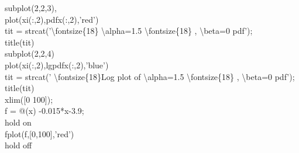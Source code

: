 \documentclass[twoside,twocolumn]{article}
\begin{document}
\begin{itshape}
subplot(2,2,3),\\
plot(xi(:,2),pdfx(:,2),'red')\\
tit = strcat('\textbackslash fontsize\{18\} \textbackslash alpha=1.5 \textbackslash fontsize\{18\} , \textbackslash beta=0 pdf');\\
title(tit)\\
subplot(2,2,4)\\
plot(xi(:,2),lgpdfx(:,2),'blue')\\
tit = strcat(' \textbackslash fontsize\{18\}Log plot of \textbackslash alpha=1.5 \textbackslash fontsize\{18\} , \textbackslash beta=0 pdf');\\
title(tit)\\
xlim([0 100]);\\
f = @(x) -0.015*x-3.9;\\
hold on\\
fplot(f,[0,100],'red')\\
hold off\\
\end{itshape}
\end{document}
